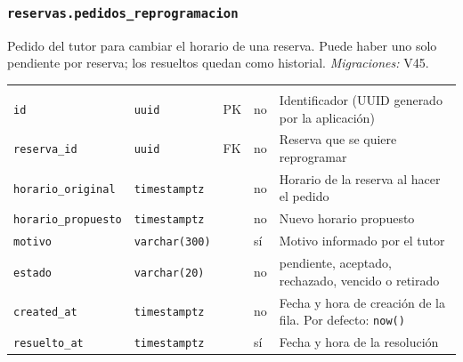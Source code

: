 \subsubsection{\texorpdfstring{\texttt{reservas.pedidos\_\allowbreak{}reprogramacion}}{reservas.pedidos\_reprogramacion}}\label{dd:reservas.pedidos_reprogramacion}

Pedido del tutor para cambiar el horario de una reserva. Puede haber uno solo pendiente por reserva; los resueltos quedan como historial. \emph{Migraciones:} V45.

{\small
\begin{xltabular}{\textwidth}{@{}>{\raggedright\arraybackslash}p{3.6cm} >{\raggedright\arraybackslash}p{2.3cm} >{\raggedright\arraybackslash}p{1cm} >{\centering\arraybackslash}p{0.85cm} L@{}}
    \toprule
     &  &  &  &  \\
    \midrule
    \endfirsthead
    \toprule
     &  &  &  &  \\
    \midrule
    \endhead
    \bottomrule
    \endfoot
    \texttt{id} & \texttt{uuid} & PK & no & Identificador (UUID generado por la aplicación) \\
    \texttt{reserva\_\allowbreak{}id} & \texttt{uuid} & FK & no & Reserva que se quiere reprogramar \\
    \texttt{horario\_\allowbreak{}original} & \texttt{timestamptz} &  & no & Horario de la reserva al hacer el pedido \\
    \texttt{horario\_\allowbreak{}propuesto} & \texttt{timestamptz} &  & no & Nuevo horario propuesto \\
    \texttt{motivo} & \texttt{varchar(\allowbreak{}300)} &  & sí & Motivo informado por el tutor \\
    \texttt{estado} & \texttt{varchar(\allowbreak{}20)} &  & no & pendiente, aceptado, rechazado, vencido o retirado \\
    \texttt{created\_\allowbreak{}at} & \texttt{timestamptz} &  & no & Fecha y hora de creación de la fila. Por defecto: \texttt{now(\allowbreak{})} \\
    \texttt{resuelto\_\allowbreak{}at} & \texttt{timestamptz} &  & sí & Fecha y hora de la resolución \\
\end{xltabular}
}

